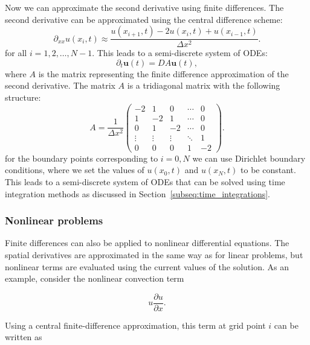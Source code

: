 Now we can approximate the second derivative using finite differences. The second derivative can be approximated using the central difference scheme:
\begin{equation}
    \partial_{xx} u(x_i, t) \approx \frac{u(x_{i+1}, t) - 2u(x_i, t) + u(x_{i-1}, t)}{\Delta x^2}.
\end{equation}
for all $i = 1, 2, \ldots, N-1$. This leads to a semi-discrete system of ODEs:
\begin{equation}
    \partial_t \mathbf{u}(t) = D A \mathbf{u}(t),
\end{equation}
where $A$ is the matrix representing the finite difference approximation of the second derivative. The matrix $A$ is a tridiagonal matrix with the following structure:
\begin{equation}
    A = \frac{1}{\Delta x^2} \begin{pmatrix}
        -2 & 1 & 0 & \cdots & 0 \\
        1 & -2 & 1 & \cdots & 0 \\
        0 & 1 & -2 & \cdots & 0 \\
        \vdots & \vdots & \vdots & \ddots & 1 \\
        0 & 0 & 0 & 1 & -2
    \end{pmatrix}.
\end{equation}
for the boundary points corresponding to $i = 0, N$ we can use Dirichlet boundary conditions, where we set the values of $u(x_0, t)$ and $u(x_{N}, t)$ to be constant. This leads to a semi-discrete system of ODEs that can be solved using time integration methods as discussed in Section~\ref{subseq:time_integrations}.

\subsubsection{Nonlinear problems}
\label{subsubsec:num_fd_nonlinear}

Finite differences can also be applied to nonlinear differential equations. The spatial derivatives are approximated in the same way as for linear problems, but nonlinear terms are evaluated using the current values of the solution. As an example, consider the nonlinear convection term

\begin{equation}
u\frac{\partial u}{\partial x}.
\end{equation}

Using a central finite-difference approximation, this term at grid point $i$ can be written as

